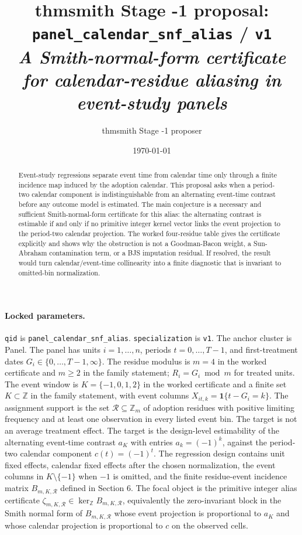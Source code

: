 \documentclass[11pt]{article}
\title{thmsmith Stage -1 proposal: \texttt{panel\_calendar\_snf\_alias} / \texttt{v1}%
  \\ \large\textit{A Smith-normal-form certificate for calendar-residue aliasing in event-study panels}}
\author{thmsmith Stage -1 proposer}
\date{\today}
\newcommand{\one}{\mathbf{1}}
\newcommand{\calR}{\mathcal{R}}
\theoremstyle{definition}
\theoremstyle{plain}
\theoremstyle{remark}
\begin{document}
\maketitle


\paragraph{Locked parameters.}
\texttt{qid} is \texttt{panel\_calendar\_snf\_alias}. \texttt{specialization} is \texttt{v1}. The anchor cluster is Panel. The panel has units $i=1,\ldots,n$, periods $t=0,\ldots,T-1$, and first-treatment dates $G_i\in\{0,\ldots,T-1,\infty\}$. The residue modulus is $m=4$ in the worked certificate and $m\geq 2$ in the family statement; $R_i=G_i\bmod m$ for treated units. The event window is $K=\{-1,0,1,2\}$ in the worked certificate and a finite set $K\subset\mathbb{Z}$ in the family statement, with event columns $X_{it,k}=\one\{t-G_i=k\}$. The assignment support is the set $\calR\subseteq\mathbb{Z}_m$ of adoption residues with positive limiting frequency and at least one observation in every listed event bin. The target is not an average treatment effect. The target is the design-level estimability of the alternating event-time contrast $a_K$ with entries $a_k=(-1)^k$, against the period-two calendar component $c(t)=(-1)^t$. The regression design contains unit fixed effects, calendar fixed effects after the chosen normalization, the event columns in $K\setminus\{-1\}$ when $-1$ is omitted, and the finite residue-event incidence matrix $B_{m,K,\calR}$ defined in Section 6. The focal object is the primitive integer alias certificate $\zeta_{m,K,\calR}\in\ker_{\mathbb{Z}} B_{m,K,\calR}$, equivalently the zero-invariant block in the Smith normal form of $B_{m,K,\calR}$ whose event projection is proportional to $a_K$ and whose calendar projection is proportional to $c$ on the observed cells.

\begin{abstract}
Event-study regressions separate event time from calendar time only through a finite incidence map induced by the adoption calendar. This proposal asks when a period-two calendar component is indistinguishable from an alternating event-time contrast before any outcome model is estimated. The main conjecture is a necessary and sufficient Smith-normal-form certificate for this alias: the alternating contrast is estimable if and only if no primitive integer kernel vector links the event projection to the period-two calendar projection. The worked four-residue table gives the certificate explicitly and shows why the obstruction is not a Goodman-Bacon weight, a Sun-Abraham contamination term, or a BJS imputation residual. If resolved, the result would turn calendar/event-time collinearity into a finite diagnostic that is invariant to omitted-bin normalization.
\end{abstract}
\end{document}
